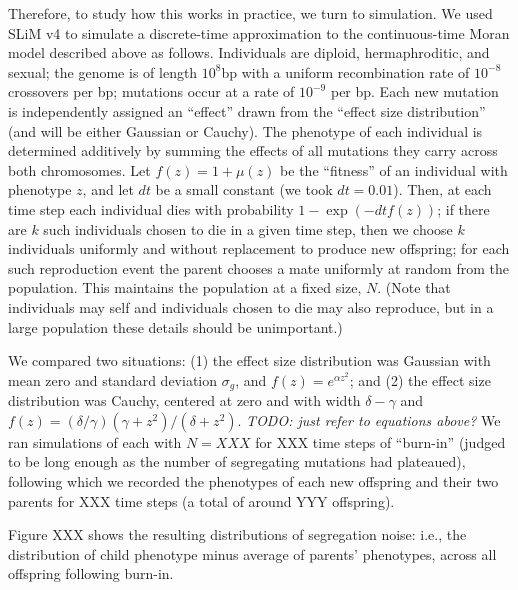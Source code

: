 \documentclass{article}
\newcommand{\comment}[1]{{\color{blue} \it #1}}
\theoremstyle{remark}
\theoremstyle{definition}
\begin{document}
Therefore,
to study how this works in practice, we turn to simulation.
We used SLiM v4 \citep{haller2022slim4}
to simulate a discrete-time approximation to the continuous-time Moran model described above
as follows.
Individuals are diploid, hermaphroditic, and sexual;
the genome is of length $10^8$bp with a uniform recombination rate of $10^{-8}$ crossovers per bp;
mutations occur at a rate of $10^{-9}$ per bp.
Each new mutation is independently assigned an ``effect''
drawn from the ``effect size distribution'' (and will be either Gaussian or Cauchy).
The phenotype of each individual is determined additively
by summing the effects of all mutations they carry across both chromosomes.
Let $f(z) = 1 + \mu(z)$
be the ``fitness'' of an individual with phenotype $z$,
and let $dt$ be a small constant (we took $dt=0.01$).
Then, at each time step
each individual dies with probability $1 - \exp(-dt f(z))$;
if there are $k$ such individuals chosen to die in a given time step,
then we choose $k$ individuals uniformly and without replacement
to produce new offspring;
for each such reproduction event the parent chooses a mate uniformly at random from the population.
This maintains the population at a fixed size, $N$.
(Note that individuals may self and individuals chosen to die may also reproduce,
but in a large population these details should be unimportant.)

We compared two situations:
(1) the effect size distribution was Gaussian with mean zero and standard deviation $\sigma_g$,
and $f(z) = e^{\alpha z^2}$; and
(2) the effect size distribution was Cauchy, centered at zero and with width $\delta - \gamma$
and $f(z) = (\delta/\gamma) (\gamma + z^2) / (\delta + z^2)$.
\comment{TODO: just refer to equations above?}
We ran simulations of each with $N=XXX$ for XXX time steps of ``burn-in''
(judged to be long enough as the number of segregating mutations had plateaued),
following which we recorded the phenotypes of each new offspring and their two parents
for XXX time steps (a total of around YYY offspring).

Figure XXX shows the resulting distributions of segregation noise:
i.e., the distribution of child phenotype minus average of parents' phenotypes,
across all offspring following burn-in.





\appendix
\end{document}
